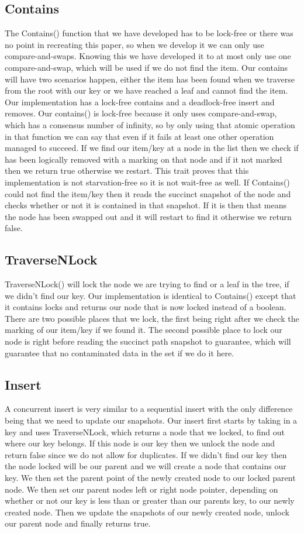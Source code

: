 \documentclass[conference]{IEEEtran}
\begin{document}
\subsection{Contains}
The Contains() function that we have developed has to be lock-free or there was no point in recreating this paper, so when we develop it we can only use compare-and-swaps. Knowing this we have developed it to at most only use one compare-and-swap, which will be used if we do not find the item. Our contains will have two scenarios happen, either the item has been found when we traverse from the root with our key or we have reached a leaf and cannot find the item.
Our implementation has a lock-free contains and a deadlock-free insert and removes. Our contains() is lock-free because it only uses compare-and-swap, which has a consensus number of infinity, so by only using that atomic operation in that function we can say that even if it fails at least one other operation managed to succeed. If we find our item/key at a node in the list then we check if has been logically removed with a marking on that node and if it not marked then we return true otherwise we restart. This trait proves that this implementation is not starvation-free so it is not wait-free as well. If Contains() could not find the item/key then it reads the succinct snapshot of the node and checks whether or not it is contained in that snapshot. If it is then that means the node has been swapped out and it will restart to find it otherwise we return false.
\subsection{TraverseNLock}
TraverseNLock() will lock the node we are trying to find or a leaf in the tree, if we didn't find our key. Our implementation is identical to Contains() except that it contains locks and returns our node that is now locked instead of a boolean. There are two possible places that we lock, the first being right after we check the marking of our item/key if we found it. The second possible place to lock our node is right before reading the succinct path snapshot to guarantee, which will guarantee that no contaminated data in the set if we do it here.
\subsection{Insert}
A concurrent insert is very similar to a sequential insert with the only difference being that we need to update our snapshots. Our insert first starts by taking in a key and uses TraverseNLock, which returns a node that we locked, to find out where our key belongs. If this node is our key then we unlock the node and return false since we do not allow for duplicates. If we didn't find our key then the node locked will be our parent and we will create a node that contains our key. We then set the parent point of the newly created node to our locked parent node. We then set our parent nodes left or right node pointer, depending on whether or not our key is less than or greater than our parents key, to our newly created node. Then we update the snapshots of our newly created node, unlock our parent node and finally returns true.
\end{document}
